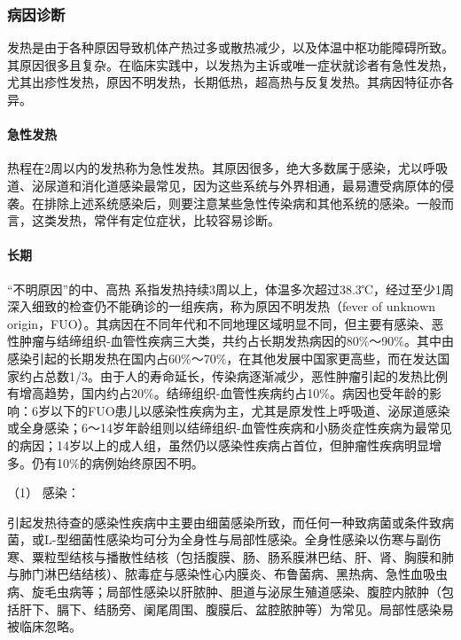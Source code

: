 \subsubsection{病因诊断}

发热是由于各种原因导致机体产热过多或散热减少，以及体温中枢功能障碍所致。其原因很多且复杂。在临床实践中，以发热为主诉或唯一症状就诊者有急性发热，尤其出疹性发热，原因不明发热，长期低热，超高热与反复发热。其病因特征亦各异。

\paragraph{急性发热}

热程在2周以内的发热称为急性发热。其原因很多，绝大多数属于感染，尤以呼吸道、泌尿道和消化道感染最常见，因为这些系统与外界相通，最易遭受病原体的侵袭。在排除上述系统感染后，则要注意某些急性传染病和其他系统的感染。一般而言，这类发热，常伴有定位症状，比较容易诊断。

\paragraph{长期}

“不明原因”的中、高热
系指发热持续3周以上，体温多次超过38.3℃，经过至少1周深入细致的检查仍不能确诊的一组疾病，称为原因不明发热（fever
of unknown
origin，FUO）。其病因在不同年代和不同地理区域明显不同，但主要有感染、恶性肿瘤与结缔组织-血管性疾病三大类，共约占长期发热病因的80\%～90\%。其中由感染引起的长期发热在国内占60\%～70\%，在其他发展中国家更高些，而在发达国家约占总数1/3。由于人的寿命延长，传染病逐渐减少，恶性肿瘤引起的发热比例有增高趋势，国内约占20\%。结缔组织-血管性疾病约占10\%。病因也受年龄的影响：6岁以下的FUO患儿以感染性疾病为主，尤其是原发性上呼吸道、泌尿道感染或全身感染；6～14岁年龄组则以结缔组织-血管性疾病和小肠炎症性疾病为最常见的病因；14岁以上的成人组，虽然仍以感染性疾病占首位，但肿瘤性疾病明显增多。仍有10\%的病例始终原因不明。

\hypertarget{text00008.htmlux5cux23CHP1-1-2-4-2-1}{}
（1） 感染：

引起发热待查的感染性疾病中主要由细菌感染所致，而任何一种致病菌或条件致病菌，或L-型细菌性感染均可分为全身性与局部性感染。全身性感染以伤寒与副伤寒、粟粒型结核与播散性结核（包括腹膜、肠、肠系膜淋巴结、肝、肾、胸膜和肺与肺门淋巴结结核）、脓毒症与感染性心内膜炎、布鲁菌病、黑热病、急性血吸虫病、旋毛虫病等；局部性感染以肝脓肿、胆道与泌尿生殖道感染、腹腔内脓肿（包括肝下、膈下、结肠旁、阑尾周围、腹膜后、盆腔脓肿等）为常见。局部性感染易被临床忽略。

